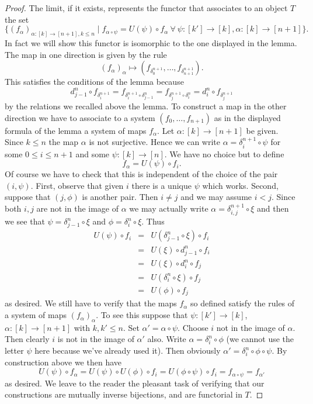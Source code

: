 \begin{proof}
The limit, if it exists, represents the functor
that associates to an object $T$ the set
$$
\{
(f_\alpha)_{\alpha : [k] \to [n + 1], k \leq n}
\mid
f_{\alpha \circ \psi} = U(\psi) \circ f_\alpha\ \forall
\ \psi : [k'] \to [k], \alpha : [k] \to [n + 1]
\}.
$$
In fact we will show this functor is isomorphic to the
one displayed in the lemma. The map in one direction
is given by the rule
$$
(f_\alpha)_{\alpha}
\longmapsto
(f_{\delta^{n + 1}_0}, \ldots, f_{\delta^{n + 1}_{n + 1}}).
$$
This satisfies the conditions of the lemma because
$$
d^n_{j - 1} \circ f_{\delta^{n + 1}_i} =
f_{\delta^{n + 1}_i \circ \delta^n_{j - 1}} =
f_{\delta^{n + 1}_j \circ \delta^n_i} =
d^n_i \circ f_{\delta^{n + 1}_j}
$$
by the relations we recalled above the lemma. To construct a map
in the other direction we have to associate to a system
$(f_0, \ldots, f_{n + 1})$ as in the displayed formula
of the lemma a system of maps $f_\alpha$. Let $\alpha : [k] \to [n + 1]$
be given. Since $k \leq n$ the map $\alpha$ is not surjective.
Hence we can write $\alpha = \delta^{n + 1}_i \circ \psi$
for some $0 \leq i \leq n + 1$ and some
$\psi : [k] \to [n]$. We have no choice but to define
$$
f_\alpha = U(\psi) \circ f_i.
$$
Of course we have to check that this is independent of the
choice of the pair $(i, \psi)$. First, observe that given $i$
there is a unique $\psi$ which works. Second, suppose that $(j, \phi)$ is
another pair. Then $i \not = j$ and we may assume $i < j$. Since
both $i, j$ are not in the image of $\alpha$ we may actually
write $\alpha = \delta^{n + 1}_{i, j} \circ \xi$ and then
we see that $\psi = \delta^n_{j - 1} \circ \xi$ and
$\phi = \delta^n_i \circ \xi$. Thus
\begin{eqnarray*}
U(\psi) \circ f_i & = & U(\delta^n_{j - 1} \circ \xi) \circ f_i \\
& = & U(\xi) \circ d^n_{j - 1} \circ f_i \\
& = & U(\xi) \circ d^n_i \circ f_j \\
& = & U(\delta^n_i \circ \xi) \circ f_j \\
& = & U(\phi) \circ f_j
\end{eqnarray*}
as desired. We still have to verify that the maps
$f_\alpha$ so defined satisfy the rules of a system
of maps $(f_\alpha)_\alpha$. To see this suppose that
$\psi : [k'] \to [k]$, $\alpha : [k] \to [n + 1]$ with
$k, k' \leq n$. Set $\alpha' = \alpha \circ \psi$.
Choose $i$ not in the image of $\alpha$. Then clearly
$i$ is not in the image of $\alpha'$ also. Write
$\alpha = \delta^n_i \circ \phi$ (we cannot use the letter $\psi$ here
because we've already used it). Then obviously
$\alpha' = \delta^n_i \circ \phi \circ \psi$. By construction above
we then have
$$
U(\psi) \circ f_\alpha = U(\psi) \circ U(\phi) \circ f_i
= U(\phi \circ \psi) \circ f_i = f_{\alpha \circ \psi} = f_{\alpha'}
$$
as desired. We leave to the reader the pleasant task of verifying
that our constructions are mutually inverse bijections, and are
functorial in $T$.
\end{proof}

